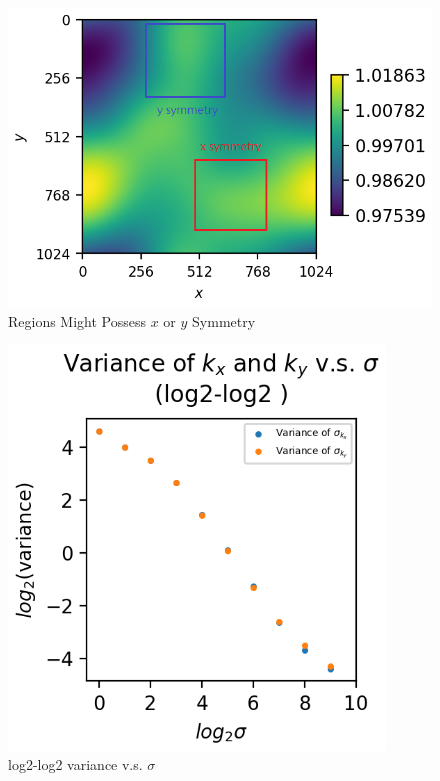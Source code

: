 \documentclass[a4paper,10pt]{article}
\begin{document}
\begin{large}
\begin{figure}[htbp] %
\centering %
\includegraphics[width=13cm]{x_symmetry_and_y_symmetry_text.png} %
\caption{Regions Might Possess $x$ or $y$ Symmetry}
\end{figure}

\begin{figure}[htbp] %
\centering %
\includegraphics[width=10cm]{log2-log2_variance_v.s._sigma.png} %
\caption{log2-log2 variance v.s. $\sigma$}
\end{figure}



\end{large}
\end{document}
